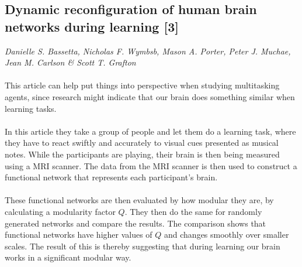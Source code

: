 \documentclass[11pt, a4paper]{article}
\begin{document}
\subsection{Dynamic reconfiguration of human brain networks during learning [3]}
\textit{Danielle S. Bassetta, Nicholas F. Wymbsb, Mason A. Porter, Peter J. Muchae, Jean M. Carlson \& Scott T. Grafton}
\\ \\
This article can help put things into perspective when studying multitasking agents, since research might indicate that our brain does something similar when learning tasks.
\\ \\
In this article they take a group of people and let them do a learning task, where they have to react swiftly and accurately to visual cues presented as musical notes. While the participants are playing, their brain is then being measured using a MRI scanner. The data from the MRI scanner is then used to construct a functional network that represents each participant’s brain.
\\ \\
These functional networks are then evaluated by how modular they are, by calculating a modularity factor $ Q $. They then do the same for randomly generated networks and compare the results. The comparison shows that functional networks have higher values of $ Q $ and changes smoothly over smaller scales. The result of this is thereby suggesting that during learning our brain works in a significant modular way.
\\ \\
\end{document}
